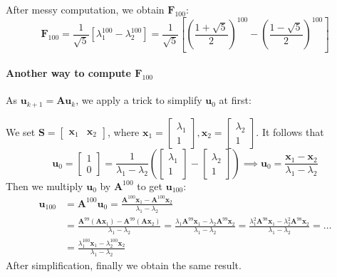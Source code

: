 After messy computation, we obtain $\bm F_{100}$:
\[
\bm F_{100}=\frac{1}{\sqrt{5}}\left[\lambda_1^{100}-\lambda_2^{100}\right]
=\frac{1}{\sqrt{5}}\left[\left(\frac{1+\sqrt{5}}{2}\right)^{100}-\left(\frac{1-\sqrt{5}}{2}\right)^{100}\right]
\]
\paragraph{Another way to compute $\bm F_{100}$}

As $\bm u_{k+1} = \bm A\bm u_k$, we apply a trick to simplify $\bm u_0$ at first:

We set $\bm S=\begin{bmatrix}
\bm x_1&\bm x_2
\end{bmatrix}$, where $\bm x_1=\begin{bmatrix}
\lambda_1\\1
\end{bmatrix},\bm x_2=\begin{bmatrix}
\lambda_2\\1
\end{bmatrix}.$
It follows that
\[
\bm u_0=\begin{bmatrix}
1\\0
\end{bmatrix}
=\frac{1}{\lambda_1-\lambda_2}\left(\begin{bmatrix}
\lambda_1\\1
\end{bmatrix}-\begin{bmatrix}
\lambda_2\\1
\end{bmatrix}\right)\implies
\bm u_0=\frac{\bm x_1-\bm x_2}{\lambda_1-\lambda_2}
\]
Then we multiply $\bm u_{0}$ by $\bm A^{100}$ to get $\bm u_{100}$:
\begin{align*}
\bm u_{100}&=\bm A^{100}\bm u_0=\frac{\bm A^{100}\bm x_1-\bm A^{100}\bm x_2}{\lambda_1-\lambda_2}\\
&=\frac{\bm A^{99}(\bm A\bm x_1)-\bm A^{99}(\bm A\bm x_2)}{\lambda_1-\lambda_2}=\frac{\lambda_1\bm A^{99}\bm x_1-\lambda_2\bm A^{99}\bm x_2}{\lambda_1-\lambda_2}=\frac{\lambda_1^2\bm A^{98}\bm x_1-\lambda_2^2\bm A^{98}\bm x_2}{\lambda_1-\lambda_2}=\dots\\
&=\frac{\lambda_1^{100}\bm x_1-\lambda_2^{100}\bm x_2}{\lambda_1-\lambda_2}
\end{align*}
After simplification, finally we obtain the same result.
